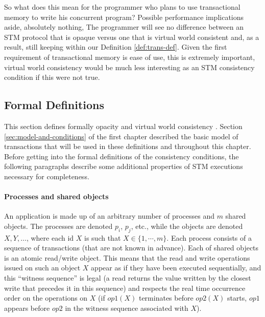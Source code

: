 So what does this mean for the programmer who plans to use transactional memory
to write his concurrent program?
Possible performance implications aside, absolutely nothing,
The programmer will see no difference between an STM protocol that is opaque
versus one that is virtual world consistent and, as a result, still keeping within our Definition \ref{def:trans-def}.
Given the first requirement of transactional memory is ease of use, this is extremely
important, virtual world consistency would be much less interesting as an STM
consistency condition if this were not true.


\subsection{Formal Definitions}


This  section  defines  formally opacity  \cite{GK08} and virtual  world
consistency \cite{IR09}.
Section \ref{sec:model-and-conditions} of the first chapter described the basic model of transactions that will
be used in these definitions and throughout this chapter.
Before getting into the formal definitions of the consistency conditions, the following paragraphs describe some additional properties
of STM executions necessary for completeness.

\paragraph{Processes and shared objects}
An application is made up of  an  arbitrary number  of  processes  and  $m$
shared  objects.  The processes are denoted $p_i$, $p_j$, etc., 
while the  objects are  denoted $X,Y,\ldots$, where each id $X$ is such 
that $X \in \{1,\cdots,m\}$.   Each process consists of  a sequence of 
transactions (that are not known in advance).
Each of shared objects is an atomic read/write object. 
This means  that the read and  write operations issued on  such an  object
$X$  appear as  if they have  been executed  sequentially, and this 
``witness sequence'' is  legal (a read returns the value written by the  
closest write  that precedes it in this sequence) and respects the real time 
occurrence  order on the operations on $X$ (if  $op1(X)$  terminates  before
$op2(X)$  starts, $op1$ appears before $op2$ in the witness sequence 
associated with $X$). 


